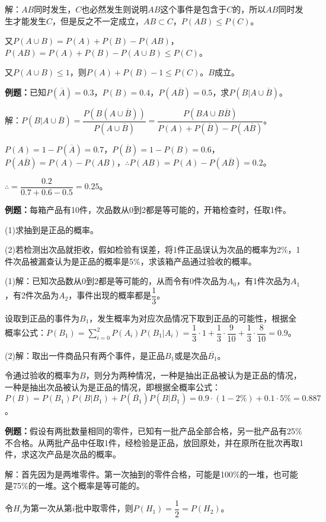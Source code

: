 解：$AB$同时发生，$C$也必然发生则说明$AB$这个事件是包含于$C$的，所以$AB$同时发生才能发生$C$，但是反之不一定成立，$AB\subset C$，$P(AB)\leqslant P(C)$。

又$P(A\cup B)=P(A)+P(B)-P(AB)$，$P(AB)=P(A)+P(B)-P(A\cup B)\leqslant P(C)$。

又$P(A\cup B)\leqslant1$，则$P(A)+P(B)-1\leqslant P(C)$。$B$成立。

\textbf{例题：}已知$P(\overline{A})=0.3$，$P(B)=0.4$，$P(A\overline{B})=0.5$，求$P(B|A\cup\overline{B})$。

解：$P(B|A\cup\overline{B})=\dfrac{P(B(A\cup\overline{B}))}{P(A\cup\overline{B})}=\dfrac{P(BA\cup B\overline{B})}{P(A)+P(\overline{B})-P(A\overline{B})}$。

$P(A)=1-P(\overline{A})=0.7$，$P(\overline{B})=1-P(B)=0.6$，$P(A\overline{B})=P(A)-P(AB)$，$\therefore P(AB)=P(A)-P(A\overline{B})=0.2$。

$\therefore =\dfrac{0.2}{0.7+0.6-0.5}=0.25$。\medskip

\textbf{例题：}每箱产品有10件，次品数从0到2都是等可能的，开箱检查时，任取1件。

(1)求抽到是正品的概率。

(2)若检测出次品就拒收，假如检验有误差，将1件正品误认为次品的概率为2\%，1件次品被漏查认为是正品的概率是5\%，求该箱产品通过验收的概率。

(1)解：已知次品数从0到2都是等可能的，从而令有0件次品为$A_0$，有1件次品为$A_1$，有2件次品为$A_2$，事件出现的概率都是$\dfrac{1}{3}$。

设取到正品的事件为$B_1$，发生概率为对应次品情况下取到正品的可能性，根据全概率公式：$P(B_1)=\sum\limits_{i=0}^2P(A_i)P(B_1|A_i)=\dfrac{1}{3}\cdot1+\dfrac{1}{3}\cdot\dfrac{9}{10}+\dfrac{1}{3}\cdot\dfrac{8}{10}=0.9$。

(2)解：取出一件商品只有两个事件，是正品$B_1$或是次品$\overline{B_1}$。

令通过验收的概率为$B$，则分为两种情况，一种是抽出正品被认为是正品的情况，一种是抽出次品被认为是正品的情况，即根据全概率公式：$P(B)=P(B_1)P(B|B_1)+P(\overline{B_1})P(B|\overline{B_1})=0.9\cdot(1-2\%)+0.1\cdot5\%=0.887$。

\textbf{例题：}假设有两批数量相同的零件，已知有一批产品全部合格，另一批产品有25\%不合格。从两批产品中任取1件，经检验是正品，放回原处，并在原所在批次再取1件，求这次产品是次品的概率。

解：首先因为是两堆零件。第一次抽到的零件合格，可能是100\%的一堆，也可能是75\%的一堆。这个概率是等可能的。

令$H_i$为第一次从第$i$批中取零件，则$P(H_1)=\dfrac{1}{2}=P(H_2)$。

